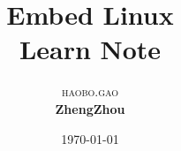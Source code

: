 \documentclass [a4paper,10pt,oneside] {article}
\begin{document}
\title{\textbf{Embed Linux }\\ %
 Learn Note}  %

\author{\textsc{haobo.gao} %
\\{\textbf{ZhengZhou}}} %

\date{\today} %
\maketitle

\tableofcontents
{}



\end{document}
